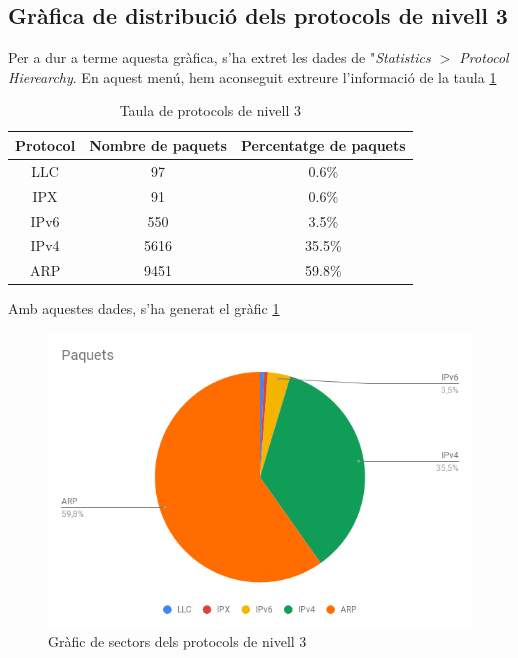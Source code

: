 \documentclass{article}
\begin{document}
\subsection{Gràfica de distribució dels protocols de nivell 3}
Per a dur a terme aquesta gràfica, s'ha extret les dades de 
"\textit{Statistics $>$ Protocol Hierearchy}. En aquest menú, hem aconseguit
extreure l'informació de la taula \ref{graph:tab}\\
\begin{table}[!h]
\centering
\begin{tabular}{ccc}
Protocol & Nombre de paquets &Percentatge de paquets\\
\hline
LLC &97 &0.6\%\\
IPX &91 &0.6\%\\
IPv6 &550 &3.5\%\\
IPv4 &5616 &35.5\%\\
ARP &9451 &59.8\%\\
\end{tabular}
\caption{Taula de protocols de nivell 3}
\label{graph:tab}
\end{table}
Amb aquestes dades, s'ha generat el gràfic \ref{graph:img}\\
\begin{figure}
\centering
\includegraphics[scale=2]{graphic.png}
\caption{Gràfic de sectors dels protocols de nivell 3}
\label{graph:img}
\end{figure}
\end{document}
